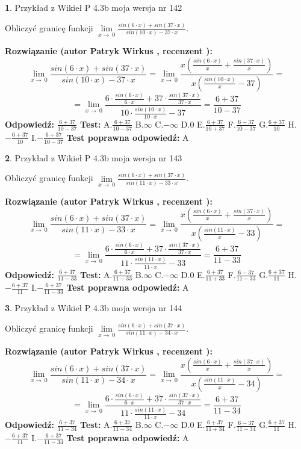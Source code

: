 \documentclass[12pt, a4paper]{article}
\theoremstyle{definition} %
\newtheorem{zad}{}
\newcommand{\zadStart}[1]{\begin{zad}#1\newline}
\newcommand{\zadStop}{\end{zad}}
\newcommand{\rozwStart}[2]{\noindent \textbf{Rozwiązanie (autor #1 , recenzent #2): }\newline}
\newcommand{\rozwStop}{\newline}
\newcommand{\odpStart}{\noindent \textbf{Odpowiedź:}\newline}
\newcommand{\odpStop}{\newline}
\newcommand{\testStart}{\noindent \textbf{Test:}\newline}
\newcommand{\testStop}{\newline}
\newcommand{\kluczStart}{\noindent \textbf{Test poprawna odpowiedź:}\newline}
\newcommand{\kluczStop}{\newline}
\begin{document}
\zadStart{Przykład z Wikieł P 4.3b moja wersja nr 142}


Obliczyć granicę funkcji $\lim\limits_{x\to\ 0}\frac{sin(6 \cdot x)+sin(37 \cdot x)}{sin(10 \cdot x)-37 \cdot x}$.
\zadStop
\rozwStart{Patryk Wirkus}{}
$$\lim\limits_{x\to\ 0}\frac{sin(6 \cdot x)+sin(37 \cdot x)}{sin(10 \cdot x)-37 \cdot x}=\lim\limits_{x\to\ 0}\frac{x(\frac{sin(6 \cdot x)}{x}+\frac{sin(37 \cdot x)}{x})}{x(\frac{sin(10 \cdot x)}{x}-37)}=$$
$$=\lim\limits_{x\to\ 0}\frac{6 \cdot \frac{sin(6 \cdot x)}{6 \cdot x}+37 \cdot \frac{sin(37 \cdot x)}{37 \cdot x}}{10 \cdot \frac{sin(10 \cdot x)}{10 \cdot x}-37}=\frac{6+37}{10-37}$$
\rozwStop
\odpStart
$\frac{6+37}{10-37}$
\odpStop
\testStart
A.$\frac{6+37}{10-37}$
B.$\infty$
C.$-\infty$
D.$0$
E.$\frac{6+37}{10+37}$
F.$\frac{6-37}{10-37}$
G.$\frac{6+37}{10}$
H.$-\frac{6+37}{10}$
I.$-\frac{6+37}{10-37}$
\testStop
\kluczStart
A
\kluczStop



\zadStart{Przykład z Wikieł P 4.3b moja wersja nr 143}


Obliczyć granicę funkcji $\lim\limits_{x\to\ 0}\frac{sin(6 \cdot x)+sin(37 \cdot x)}{sin(11 \cdot x)-33 \cdot x}$.
\zadStop
\rozwStart{Patryk Wirkus}{}
$$\lim\limits_{x\to\ 0}\frac{sin(6 \cdot x)+sin(37 \cdot x)}{sin(11 \cdot x)-33 \cdot x}=\lim\limits_{x\to\ 0}\frac{x(\frac{sin(6 \cdot x)}{x}+\frac{sin(37 \cdot x)}{x})}{x(\frac{sin(11 \cdot x)}{x}-33)}=$$
$$=\lim\limits_{x\to\ 0}\frac{6 \cdot \frac{sin(6 \cdot x)}{6 \cdot x}+37 \cdot \frac{sin(37 \cdot x)}{37 \cdot x}}{11 \cdot \frac{sin(11 \cdot x)}{11 \cdot x}-33}=\frac{6+37}{11-33}$$
\rozwStop
\odpStart
$\frac{6+37}{11-33}$
\odpStop
\testStart
A.$\frac{6+37}{11-33}$
B.$\infty$
C.$-\infty$
D.$0$
E.$\frac{6+37}{11+33}$
F.$\frac{6-37}{11-33}$
G.$\frac{6+37}{11}$
H.$-\frac{6+37}{11}$
I.$-\frac{6+37}{11-33}$
\testStop
\kluczStart
A
\kluczStop



\zadStart{Przykład z Wikieł P 4.3b moja wersja nr 144}


Obliczyć granicę funkcji $\lim\limits_{x\to\ 0}\frac{sin(6 \cdot x)+sin(37 \cdot x)}{sin(11 \cdot x)-34 \cdot x}$.
\zadStop
\rozwStart{Patryk Wirkus}{}
$$\lim\limits_{x\to\ 0}\frac{sin(6 \cdot x)+sin(37 \cdot x)}{sin(11 \cdot x)-34 \cdot x}=\lim\limits_{x\to\ 0}\frac{x(\frac{sin(6 \cdot x)}{x}+\frac{sin(37 \cdot x)}{x})}{x(\frac{sin(11 \cdot x)}{x}-34)}=$$
$$=\lim\limits_{x\to\ 0}\frac{6 \cdot \frac{sin(6 \cdot x)}{6 \cdot x}+37 \cdot \frac{sin(37 \cdot x)}{37 \cdot x}}{11 \cdot \frac{sin(11 \cdot x)}{11 \cdot x}-34}=\frac{6+37}{11-34}$$
\rozwStop
\odpStart
$\frac{6+37}{11-34}$
\odpStop
\testStart
A.$\frac{6+37}{11-34}$
B.$\infty$
C.$-\infty$
D.$0$
E.$\frac{6+37}{11+34}$
F.$\frac{6-37}{11-34}$
G.$\frac{6+37}{11}$
H.$-\frac{6+37}{11}$
I.$-\frac{6+37}{11-34}$
\testStop
\kluczStart
A
\kluczStop
\end{document}
